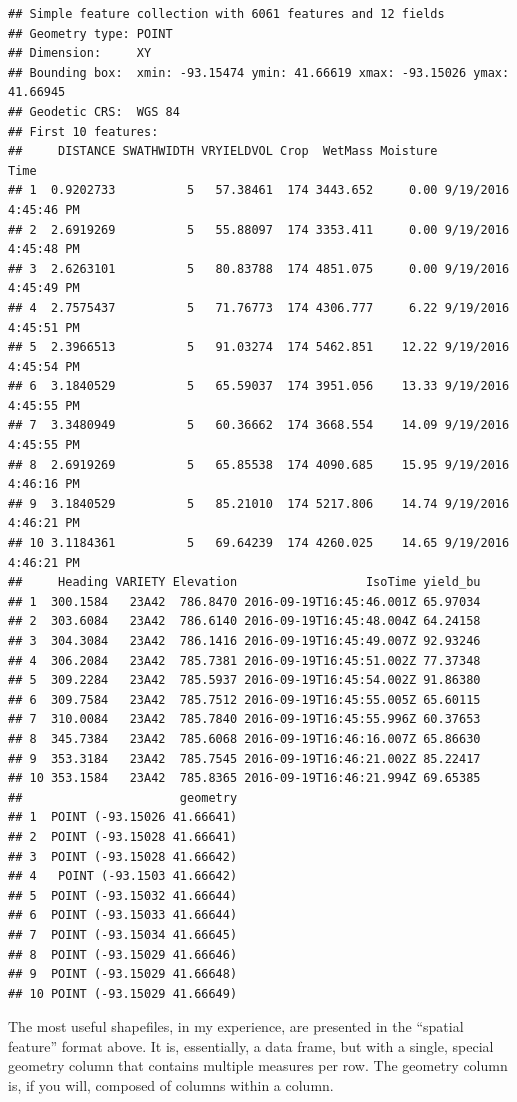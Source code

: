 \documentclass[
]{book}
\begin{document}
\begin{verbatim}
## Simple feature collection with 6061 features and 12 fields
## Geometry type: POINT
## Dimension:     XY
## Bounding box:  xmin: -93.15474 ymin: 41.66619 xmax: -93.15026 ymax: 41.66945
## Geodetic CRS:  WGS 84
## First 10 features:
##     DISTANCE SWATHWIDTH VRYIELDVOL Crop  WetMass Moisture                 Time
## 1  0.9202733          5   57.38461  174 3443.652     0.00 9/19/2016 4:45:46 PM
## 2  2.6919269          5   55.88097  174 3353.411     0.00 9/19/2016 4:45:48 PM
## 3  2.6263101          5   80.83788  174 4851.075     0.00 9/19/2016 4:45:49 PM
## 4  2.7575437          5   71.76773  174 4306.777     6.22 9/19/2016 4:45:51 PM
## 5  2.3966513          5   91.03274  174 5462.851    12.22 9/19/2016 4:45:54 PM
## 6  3.1840529          5   65.59037  174 3951.056    13.33 9/19/2016 4:45:55 PM
## 7  3.3480949          5   60.36662  174 3668.554    14.09 9/19/2016 4:45:55 PM
## 8  2.6919269          5   65.85538  174 4090.685    15.95 9/19/2016 4:46:16 PM
## 9  3.1840529          5   85.21010  174 5217.806    14.74 9/19/2016 4:46:21 PM
## 10 3.1184361          5   69.64239  174 4260.025    14.65 9/19/2016 4:46:21 PM
##     Heading VARIETY Elevation                  IsoTime yield_bu
## 1  300.1584   23A42  786.8470 2016-09-19T16:45:46.001Z 65.97034
## 2  303.6084   23A42  786.6140 2016-09-19T16:45:48.004Z 64.24158
## 3  304.3084   23A42  786.1416 2016-09-19T16:45:49.007Z 92.93246
## 4  306.2084   23A42  785.7381 2016-09-19T16:45:51.002Z 77.37348
## 5  309.2284   23A42  785.5937 2016-09-19T16:45:54.002Z 91.86380
## 6  309.7584   23A42  785.7512 2016-09-19T16:45:55.005Z 65.60115
## 7  310.0084   23A42  785.7840 2016-09-19T16:45:55.996Z 60.37653
## 8  345.7384   23A42  785.6068 2016-09-19T16:46:16.007Z 65.86630
## 9  353.3184   23A42  785.7545 2016-09-19T16:46:21.002Z 85.22417
## 10 353.1584   23A42  785.8365 2016-09-19T16:46:21.994Z 69.65385
##                      geometry
## 1  POINT (-93.15026 41.66641)
## 2  POINT (-93.15028 41.66641)
## 3  POINT (-93.15028 41.66642)
## 4   POINT (-93.1503 41.66642)
## 5  POINT (-93.15032 41.66644)
## 6  POINT (-93.15033 41.66644)
## 7  POINT (-93.15034 41.66645)
## 8  POINT (-93.15029 41.66646)
## 9  POINT (-93.15029 41.66648)
## 10 POINT (-93.15029 41.66649)
\end{verbatim}

The most useful shapefiles, in my experience, are presented in the ``spatial feature'' format above. It is, essentially, a data frame, but with a single, special geometry column that contains multiple measures per row. The geometry column is, if you will, composed of columns within a column.
\end{document}
